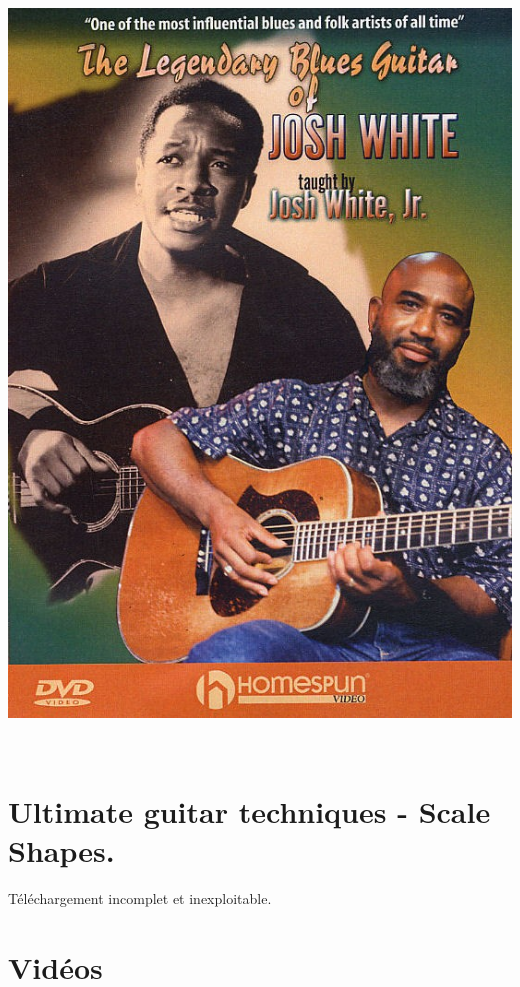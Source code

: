 \documentclass[a4paper]{book}
\begin{document}
\begin{center}
\includegraphics[width=14.446cm,height=20.373cm]{lebluessupportsmethodes-img142.jpg}
\end{center}





\clearpage\section[Ultimate guitar techniques {}- Scale
Shapes.]{Ultimate guitar techniques - Scale Shapes.}
\hypertarget{RefHeadingToc194973218262}{}T\'el\'echargement incomplet et
inexploitable.

\clearpage\section{Vidéos}
\end{document}
